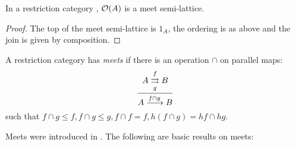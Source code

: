 \begin{lemma}\label{lem:open_a_is_a_meet_semilattice}
  In a restriction category \X, $\mathcal{O}({A})$ is a meet semi-lattice.
\end{lemma}
\begin{proof}
  The top of the meet semi-lattice is $1_A$, the ordering is as above and the join is
  given by composition.
\end{proof}

\begin{definition}
  A restriction category has \emph{meets} if there is an operation $\cap$ on parallel maps:
  \[
    \infer{A\xrightarrow{f\cap g} B}
      {A\overset{f}{\underset{g}{\rightrightarrows}}B}
  \]
  such that $f\cap g \le f, f\cap g \le g, f\cap f = f, h (f\cap g) = h f \cap hg$.
\end{definition}

Meets were introduced in \cite{cockett-guo-hofstra-2012:range2}.
The following are basic results on meets:

